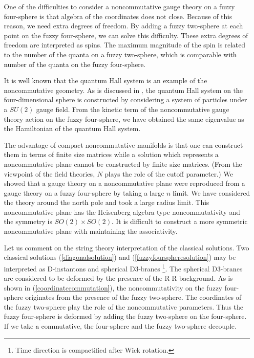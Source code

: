 \documentclass[a4paper,11pt]{article}
\begin{document}
One of the difficulties to consider a noncommutative 
gauge theory on a fuzzy four-sphere is that 
algebra of the coordinates does not close. 
Because of this reason, we need extra degrees of freedom. 
By adding a fuzzy two-sphere at each point on the fuzzy four-sphere, 
we can solve this difficulty. 
These extra degrees of freedom are interpreted as spins. 
The maximum magnitude of the spin is related to the 
number of the quanta on a fuzzy two-sphere, 
which is comparable with number of the quanta on the fuzzy four-sphere. 

It is well known that 
the quantum Hall system is an example of the noncommutative 
geometry. 
As is discussed in \cite{zhanghu}, 
the quantum Hall system on the four-dimensional sphere 
is constructed by considering 
a system of particles under a $SU(2)$ gauge field. 
From the kinetic term of the noncommutative gauge 
theory action on the fuzzy four-sphere, we have 
obtained the same eigenvalue as the 
Hamiltonian of the quantum Hall system. 

The advantage of compact noncommutative manifolds is that 
one can construct them in terms of finite size 
matrices 
while a solution which represents a noncommutative plane 
cannot be constructed by finite size matrices. 
(From the viewpoint of the field theories, 
$N$ plays the role of the cutoff parameter.) 
We showed that 
a gauge theory on a noncommutative plane 
were reproduced from 
a gauge theory on 
a fuzzy four-sphere by taking a large $n$ limit.  
We have considered the theory around the north pole and 
took a large radius limit.
This noncommutative plane has the Heisenberg algebra type 
noncommutativity and the symmetry is $SO(2)\times SO(2)$. 
It is difficult to construct a more symmetric 
noncommutative plane with maintaining the associativity. 

Let us comment on the string theory interpretation 
of the classical solutions. 
Two classical solutions (\ref{diagonalsolution}) and 
(\ref{fuzzyfourspheresolution}) 
may be interpreted as 
D-instantons and spherical D3-branes
\footnote{Time direction is compactified after 
Wick rotation.
}. 
The spherical D3-branes are considered 
to be deformed by the presence of 
the R-R background. 
As is shown in (\ref{coordinatecommutation}), 
the noncommutativity on the fuzzy four-sphere 
originates from the presence of the fuzzy two-sphere. 
The coordinates of the fuzzy two-sphere play the role 
of the noncommutative parameters. 
Thus the fuzzy four-sphere is deformed 
by adding the fuzzy two-sphere on the 
four-sphere. 
If we take a commutative, the four-sphere and 
the fuzzy two-sphere decouple. 
\end{document}
